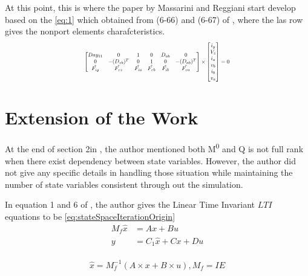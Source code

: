 \documentclass[conference]{IEEEtran}
\begin{document}
At this point, this is where the paper by Massarini and Reggiani\cite{Massarini921362} start develop based on the \eqref{eq:1} which obtained from (6-66) and 
(6-67) of \cite{LOChua}, where the las row gives the nonport elements charafcteristics.
\begin{equation}
  \resizebox{0.5\textwidth}{!}{%
  $
  \begin{bmatrix}
    Day_{11} & 0 & 1 & 0 & D_{ab} & 0\\
    0 & -(D_{zb})^T & 0 & 1 & 0 & -(D_{ab})^T\\ 
    \hat{F_{iy} }& \hat{F_{vz}}&\hat{F_{ia}}&\hat{F_{vb}}&\hat{F_{ib}}&\hat{F_{va}}
  \end{bmatrix}
  \times
  \begin{bmatrix}
      i_{y}\\
      V_{z}\\ 
      i_{a}\\ 
      v_{b}\\
      i_{b}\\
      v_{a}
  \end{bmatrix}
  =0
  $%
  }
  \label{eq:1}
  \end{equation}


\section{Extension of the Work}

At the end of section 2in \cite{Massarini921362}, the author mentioned both M\textsuperscript{0} and Q is not full rank when there 
exist dependency between state variables. However, the author did not give any specific details in handling those situation while maintaining the number of state variables
consistent through out the simulation. 


In equation 1 and 6 of \cite{Massarini921362}, the author gives the Linear Time Invariant \(LTI\) equations to be \ref{eq:stateSpaceIterationOrigin}
\begin{equation}
\begin{aligned}
  M_{f}  \hat{x} &= A x + B u \\
  y &= C_1 \hat{x} + C x + D u \\
\end{aligned}
\label{eq:stateSpaceIterationOrigin}
\end{equation}

 
\begin{equation}
  \hat{x} = M_{f}^{-1} (A\times x + B \times u), M_{f} = I E
  \label{eq:state-space-simplified}
\end{equation}
\end{document}
